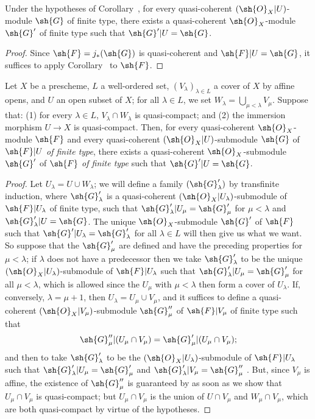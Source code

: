 \begin{corollary}[9.4.5]
\label{I.9.4.5}
Under the hypotheses of Corollary~, for every quasi-coherent $(\sh{O}_X|U)$-module
$\sh{G}$ of finite type, there exists a quasi-coherent $\sh{O}_X$-module $\sh{G}'$ of finite
type such that $\sh{G}'|U=\sh{G}$.
\end{corollary}

\begin{proof}
Since $\sh{F}=j_*(\sh{G})$ is quasi-coherent  and $\sh{F}|U=\sh{G}$, it
suffices to apply Corollary~ to $\sh{F}$.
\end{proof}

\begin{lemma}[9.4.6]
\label{I.9.4.6}
Let $X$ be a prescheme, $L$ a well-ordered set, $(V_\lambda)_{\lambda\in L}$ a cover of $X$
by affine opens, and $U$ an open subset of $X$; for all $\lambda\in L$, we set
$W_\lambda=\bigcup_{\mu<\lambda}V_\mu$. Suppose that: (1) for every $\lambda\in L$,
$V_\lambda\cap W_\lambda$ is quasi-compact; and (2) the immersion morphism $U\to X$ is
quasi-compact. Then, for every quasi-coherent $\sh{O}_X$-module $\sh{F}$ and every
quasi-coherent $(\sh{O}_X|U)$-submodule $\sh{G}$ of $\sh{F}|U$ \emph{of finite type}, there
exists a quasi-coherent $\sh{O}_X$-submodule $\sh{G}'$ of $\sh{F}$ \emph{of finite type} such
that $\sh{G}'|U=\sh{G}$.
\end{lemma}

\begin{proof}
Let $U_\lambda=U\cup W_\lambda$; we will define a family $(\sh{G}'_\lambda)$ by transfinite induction,
where $\sh{G}'_\lambda$ is a quasi-coherent $(\sh{O}_X|U_\lambda)$-submodule of
$\sh{F}|U_\lambda$ of finite type, such that $\sh{G}'_\lambda|U_\mu=\sh{G}'_\mu$ for
$\mu<\lambda$ and $\sh{G}'_\lambda|U=\sh{G}$. The unique $\sh{O}_X$-submodule $\sh{G}'$ of
$\sh{F}$ such that $\sh{G}'|U_\lambda=\sh{G}'_\lambda$ for all $\lambda\in L$  will then give
us what we want. So suppose that the $\sh{G}'_\mu$ are defined and have the preceding
properties for $\mu<\lambda$; if $\lambda$ does not have a predecessor then we take
$\sh{G}'_\lambda$ to be the unique $(\sh{O}_X|U_\lambda)$-submodule of $\sh{F}|U_\lambda$ such that
$\sh{G}'_\lambda|U_\mu=\sh{G}'_\mu$ for all $\mu<\lambda$, which is allowed since the $U_\mu$
with $\mu<\lambda$ then form a cover of $U_\lambda$. If, conversely, $\lambda=\mu+1$, then
$U_\lambda=U_\mu\cup V_\mu$, and it suffices to define a quasi-coherent
$(\sh{O}_X|V_\mu)$-submodule $\sh{G}''_\mu$ of $\sh{F}|V_\mu$ of finite type such that
\[
  \sh{G}''_\mu|(U_\mu\cap V_\mu)=\sh{G}'_\mu|(U_\mu\cap V_\mu);
\]
and then to take $\sh{G}'_\lambda$ to be the $(\sh{O}_X|U_\lambda)$-submodule of
$\sh{F}|U_\lambda$ such that $\sh{G}'_\lambda|U_\mu=\sh{G}'_\mu$ and
$\sh{G}'_\lambda|V_\mu=\sh{G}''_\mu$ . But, since $V_\mu$ is affine, the
existence of $\sh{G}''_\mu$ is guaranteed by  as soon as we show that
$U_\mu\cap V_\mu$ is quasi-compact; but $U_\mu\cap V_\mu$ is the union of $U\cap V_\mu$ and
$W_\mu\cap V_\mu$, which are both quasi-compact by virtue of the hypotheses.
\end{proof}

